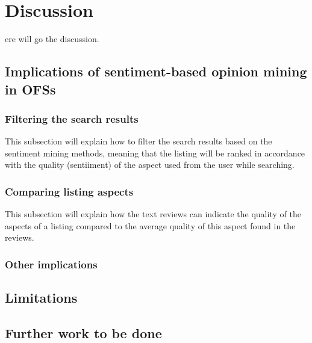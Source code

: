 %
%
\let\textcircled=\pgftextcircled
\chapter{Discussion}
\label{chap:dis}
ere will go the discussion.

\section{Implications of sentiment-based opinion mining in OFSs}
\subsection{Filtering the search results}
This subsection will explain how to filter the search results based on the sentiment mining methods, meaning that the listing will be ranked in accordance with the quality (sentiiment) of the aspect used from the user while searching. 
\subsection{Comparing listing aspects}
This subsection will explain how the text reviews can indicate the quality of the aspects of a listing compared to the average quality of this aspect found in the reviews.
\subsection{Other implications}
\section{Limitations}
\section{Further work to be done}